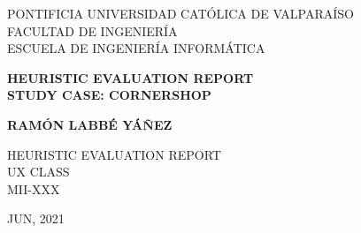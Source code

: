 \begin{center}
PONTIFICIA UNIVERSIDAD CATÓLICA DE VALPARAÍSO\\
FACULTAD DE INGENIERÍA\\
ESCUELA DE INGENIERÍA INFORMÁTICA\\

\vspace{5cm}

\Large{\textbf{HEURISTIC EVALUATION REPORT\\}}
\Large{\textbf{STUDY CASE: CORNERSHOP}}

\vspace{3cm}
\normalsize{\textbf{RAMÓN LABBÉ YÁÑEZ}}\\
\end{center}

\begin{flushright}
\vspace{3cm}
HEURISTIC EVALUATION REPORT\\
UX CLASS\\ 
MII-XXX\\ 
\end{flushright}

\vspace{1cm}
\begin{center} 
JUN, 2021\\
\end{center}